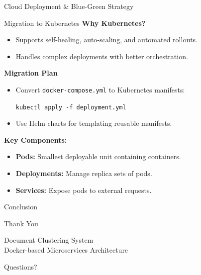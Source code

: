 \documentclass[notes]{beamer}
\begin{document}
{\begin{frame}{Cloud Deployment \& Blue-Green Strategy}
\end{frame}

\begin{frame}{Migration to Kubernetes}
    \textbf{Why Kubernetes?}
    \begin{itemize}
        \item Supports self-healing, auto-scaling, and automated rollouts.
        \item Handles complex deployments with better orchestration.
    \end{itemize}
    \textbf{Migration Plan}
    \begin{itemize}
        \item Convert \texttt{docker-compose.yml} to Kubernetes manifests:
        \begin{scriptsize}
        \texttt{kubectl apply -f deployment.yml}
        \end{scriptsize}
        \item Use Helm charts for templating reusable manifests.
    \end{itemize}
    \textbf{Key Components:}
    \begin{itemize}
        \item \textbf{Pods:} Smallest deployable unit containing containers.
        \item \textbf{Deployments:} Manage replica sets of pods.
        \item \textbf{Services:} Expose pods to external requests.
    \end{itemize}
\end{frame}
}

\begin{frame}{Conclusion}
    \begin{center}
        \Large{Thank You}
        
        \vspace{0.5cm}
        \normalsize{Document Clustering System}\\
        Docker-based Microservices Architecture
        
        \vspace{0.5cm}
        Questions?
    \end{center}
\end{frame}
\end{document}
